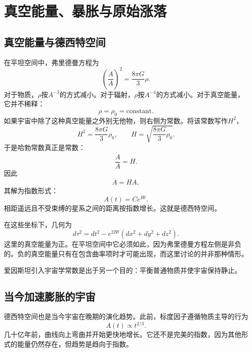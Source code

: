 \chapter{真空能量、暴胀与原始涨落}

\section{真空能量与德西特空间}

在平坦空间中，弗里德曼方程为
\begin{equation}
\left(\frac{\dot A}{A}\right)^2=\frac{8\pi G}{3}\rho.
\end{equation}
对于物质，\(\rho\)按\(A^{-3}\)的方式减小。对于辐射，\(\rho\)按\(A^{-4}\)的方式减小。对于真空能量，它并不稀释：
\begin{equation}
\rho=\rho_0=\text{constant}.
\end{equation}
如果宇宙中除了这种真空能量之外别无他物，则右侧为常数。将该常数写作\(H^2\)，
\begin{equation}
H^2=\frac{8\pi G}{3}\rho_0,
\qquad
H=\sqrt{\frac{8\pi G}{3}\rho_0}.
\end{equation}
于是哈勃常数真正是常数：
\begin{equation}
\frac{\dot A}{A}=H.
\end{equation}
因此
\begin{equation}
\dot A=HA,
\end{equation}
其解为指数形式：
\begin{equation}
A(t)=C e^{Ht}.
\end{equation}
相距遥远且不受束缚的星系之间的距离按指数增长。这就是德西特空间。

在这些坐标下，几何为
\begin{equation}
d\tau^2=dt^2-e^{2Ht}\left(dx^2+dy^2+dz^2\right).
\end{equation}
这里的真空能量为正。在平坦空间中它必须如此，因为弗里德曼方程左侧是非负的。负的真空能量只有在包含曲率项时才可能出现，而这里讨论的并非那种情形。

爱因斯坦引入宇宙学常数是出于另一个目的：平衡普通物质并使宇宙保持静止。

\section{当今加速膨胀的宇宙}

德西特空间也是当今宇宙在晚期的演化趋势。此前，标度因子遵循物质主导的行为
\begin{equation}
A(t)\propto t^{2/3}.
\end{equation}
几十亿年前，曲线向上弯曲并开始更快地增长。它还不是完美的指数，因为其他形式的能量仍然存在，但趋势是趋向于指数。

